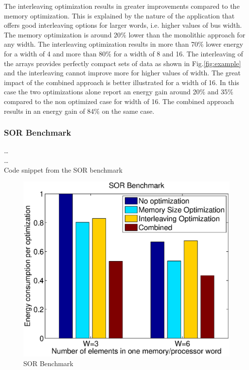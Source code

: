 \documentclass[prodmode,acmtecs]{acmsmall}
\begin{document}
The interleaving optimization results in greater improvements compared to the memory optimization.
This is explained by the nature of the application that offers good interleaving options for larger words, i.e. higher values of bus width.
The memory optimization is around 20\% lower than the monolithic approach for any width.
The interleaving optimization results in more than 70\% lower energy for a width of 4 and more than 80\% for a width of 8 and 16.
The interleaving of the arrays provides perfectly compact sets of data as shown in Fig.\ref{fig:example} and the interleaving cannot improve more for higher values of width.
The great impact of the combined approach is better illustrated for a width of 16. 
In this case the two optimizations alone report an energy gain around 20\% and 35\% compared to the non optimized case for width of 16.
The combined approach results in an energy gain of 84\% on the same case.

\subsubsection{SOR Benchmark}

\begin{algorithm}[t]
\SetAlgoNoLine
\ldots \\
{}	
 \ldots \\		
\caption{Code snippet from the SOR benchmark}
\label{alg:sor}
\end{algorithm}

\begin{figure}
\centering
	\includegraphics[scale = 0.5]{Images/sor.eps} 
	\caption{SOR Benchmark}
	\label{fig:sor}
\end{figure}
\end{document}
